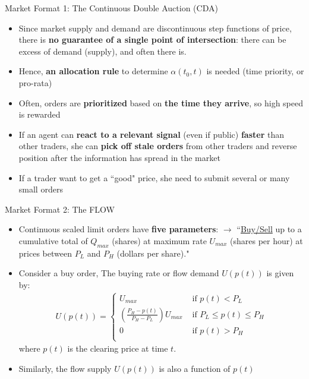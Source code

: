 \documentclass[10pt]{beamer}
\begin{document}
\begin{frame}{Market Format 1: The Continuous Double Auction (CDA)}
    \begin{itemize}
        \item Since market supply and demand are discontinuous step functions of price, there is \textbf{no guarantee of a single point of intersection}: there can be excess of demand (supply), and often there is. 
        \item Hence, \textbf{an allocation rule} to determine $\alpha(t_0, t)$ is needed (time priority, or pro-rata)
        \item Often, orders are \textbf{prioritized} based on \textbf{the time they arrive}, so high speed is rewarded
        \item If an agent can \textbf{react to a relevant signal} (even if public) \textbf{faster} than other traders, she can \textbf{pick off stale orders} from other traders and reverse position after the information has spread in the market
        \item If a trader want to get a ``good" price, she need to submit several or many small orders
    \end{itemize}
\end{frame}

\begin{frame}{Market Format 2: The FLOW}
    \begin{itemize}
        \item Continuous scaled limit orders have \textbf{five parameters}: $\rightarrow$ ``\underline{Buy/Sell} up to a cumulative total of  \underline{$Q_{max}$} (shares) at maximum rate \underline{$U_{max}$} (shares per hour) at prices between \underline{$P_{L}$} and \underline{$P_{H}$} (dollars per share)."
        \item Consider a buy order, The buying rate or flow demand $U(p(t))$ is given by:
            \begin{align}
                U{(p(t))}=
                \begin{cases}
                    U_{max} & \text{ if } p{(t)} < P_{L} \\
                    (\frac{P_{H}-p(t)}{P_{H}-P_{L}})U_{max} & \text{ if } P_L \leq p{(t)} \leq P_H \\
                    0  & \text{ if } p{(t)} > P_{H} \\
                \end{cases}
            \end{align}
        where $p(t)$ is the clearing price at time $t$.
        \item Similarly, the flow supply $U(p(t))$ is also a function of $p(t)$
    \end{itemize}
\end{frame}
\end{document}
